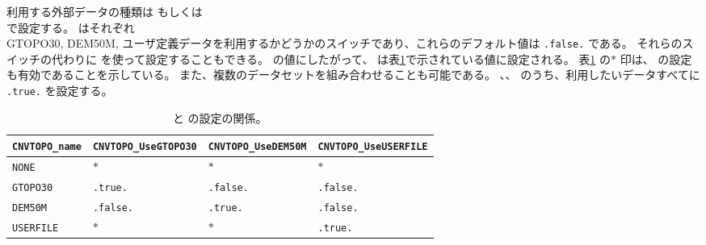 利用する外部データの種類は  もしくは \\  で設定する。
 はそれぞれ \\ GTOPO30, DEM50M, ユーザ定義データを利用するかどうかのスイッチであり、これらのデフォルト値は \verb|.false.| である。
それらのスイッチの代わりに  を使って設定することもできる。
 の値にしたがって、 は表\ref{tab:cvntopo_name}で示されている値に設定される。
表\ref{tab:cvntopo_name} の$\ast$ 印は、
 の設定も有効であることを示している。
また、複数のデータセットを組み合わせることも可能である。
、、 のうち、利用したいデータすべてに \verb|.true.| を設定する。


\begin{table}[tbh]
\begin{center}
\caption{ と  の設定の関係。}
\begin{tabularx}{150mm}{l|l|l|l} \hline
  \rowcolor[gray]{0.9} \verb|CNVTOPO_name|   & \verb|CNVTOPO_UseGTOPO30| & \verb|CNVTOPO_UseDEM50M| & \verb|CNVTOPO_UseUSERFILE| \\ \hline
                       \verb|NONE|           & $\ast$         & $\ast$         & $\ast$          \\ \hline
                       \verb|GTOPO30|        & \verb|.true.|  & \verb|.false.| & \verb|.false.|  \\ \hline
                       \verb|DEM50M|         & \verb|.false.| & \verb|.true.|  & \verb|.false.|  \\ \hline
                       \verb|USERFILE|       & $\ast$         & $\ast$         & \verb|.true.|   \\ \hline
\end{tabularx}
\label{tab:cvntopo_name}
\end{center}
\end{table}




